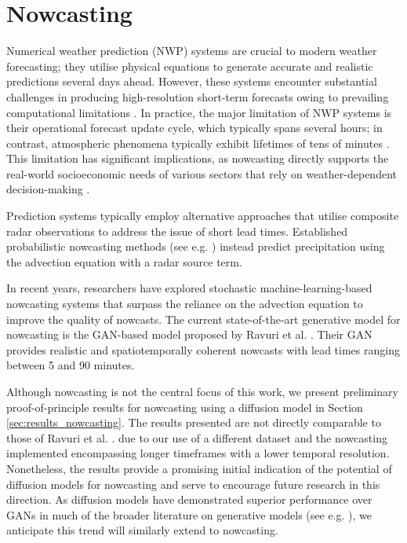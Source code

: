 \documentclass[ oneside,%
                    author={George Herbert},
                    degree={MSci},
                     title={Diffusion Models for Time-Evolving Precipitation Fields},
                  subtitle={}]{dissertation}
\begin{document}
\section{Nowcasting}

Numerical weather prediction (NWP) systems are crucial to modern weather forecasting; they utilise physical equations to generate accurate and realistic predictions several days ahead. However, these systems encounter substantial challenges in producing high-resolution short-term forecasts owing to prevailing computational limitations \cite{Wilson_Nowcasting_Challenges}. In practice, the major limitation of NWP systems is their operational forecast update cycle, which typically spans several hours; in contrast, atmospheric phenomena typically exhibit lifetimes of tens of minutes \cite{Piece_Nowcasting}. This limitation has significant implications, as nowcasting directly supports the real-world socioeconomic needs of various sectors that rely on weather-dependent decision-making \cite{Wilson_Nowcasting_Challenges}.

Prediction systems typically employ alternative approaches that utilise composite radar observations to address the issue of short lead times. Established probabilistic nowcasting methods (see e.g. \cite{Bowler_STEPS}) instead predict precipitation using the advection equation with a radar source term.

In recent years, researchers have explored stochastic machine-learning-based nowcasting systems that surpass the reliance on the advection equation to improve the quality of nowcasts. The current state-of-the-art generative model for nowcasting is the GAN-based model proposed by Ravuri et al. \cite{Ravuri_Skillful_Precipitation_Nowcasting}. Their GAN provides realistic and spatiotemporally coherent nowcasts with lead times ranging between 5 and 90 minutes.

Although nowcasting is not the central focus of this work, we present preliminary proof-of-principle results for nowcasting using a diffusion model in Section \ref{sec:results_nowcasting}. The results presented are not directly comparable to those of Ravuri et al. \cite{Ravuri_Skillful_Precipitation_Nowcasting}. due to our use of a different dataset and the nowcasting implemented encompassing longer timeframes with a lower temporal resolution. Nonetheless, the results provide a promising initial indication of the potential of diffusion models for nowcasting and serve to encourage future research in this direction. As diffusion models have demonstrated superior performance over GANs in much of the broader literature on generative models (see e.g. \cite{DDPM_Ho, Cascaded_Ho, Imagen_Saharia}), we anticipate this trend will similarly extend to nowcasting.
\end{document}
